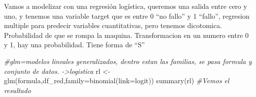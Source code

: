 \documentclass[
]{article}
\newenvironment{Shaded}{\begin{snugshade}}{\end{snugshade}}
\newcommand{\AttributeTok}[1]{\textcolor[rgb]{0.77,0.63,0.00}{#1}}
\newcommand{\CommentTok}[1]{\textcolor[rgb]{0.56,0.35,0.01}{\textit{#1}}}
\newcommand{\FunctionTok}[1]{\textcolor[rgb]{0.00,0.00,0.00}{#1}}
\newcommand{\NormalTok}[1]{#1}
\newcommand{\OtherTok}[1]{\textcolor[rgb]{0.56,0.35,0.01}{#1}}
\newcommand{\StringTok}[1]{\textcolor[rgb]{0.31,0.60,0.02}{#1}}
\begin{document}
Vamos a modelizar con una regresión logística, queremos una salida entre
cero y uno, y tenemos una variable target que es entre 0 ``no fallo'' y
1 ``fallo'', regresion multiple para predecir variables cuantitativas,
pero tenemos dicotomica. Probabilidad de que se rompa la maquina.
Transformacion en un numero entre 0 y 1, hay una probabilidad. Tiene
forma de ``S''

\begin{Shaded}
\begin{Highlighting}[]
\CommentTok{\#glm=modelos lineales generalizados, dentro estan las familias, se pasa formula y conjunto de datos. {-}\textgreater{}logistica}
\NormalTok{rl }\OtherTok{\textless{}{-}} \FunctionTok{glm}\NormalTok{(formula,df\_red,}\AttributeTok{family=}\FunctionTok{binomial}\NormalTok{(}\AttributeTok{link=}\StringTok{\textquotesingle{}logit\textquotesingle{}}\NormalTok{))}
\FunctionTok{summary}\NormalTok{(rl) }\CommentTok{\#Vemos el resultado}
\end{Highlighting}
\end{Shaded}
\end{document}
